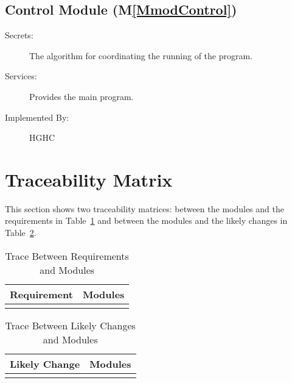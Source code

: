 \documentclass[12pt]{article}
\begin{document}
\subsection{Control Module (M\ref{MmodControl})}
\label{Sec:CM()}
\begin{description}
\item[Secrets:]The algorithm for coordinating the running of the program.
\item[Services:]Provides the main program.
\item[Implemented By:]HGHC
\end{description}
\section{Traceability Matrix}
\label{Sec:TM}
This section shows two traceability matrices: between the modules and the requirements in Table~\ref{Table:TBRaM} and between the modules and the likely changes in Table~\ref{Table:TBLCaM}.
\begin{longtable}{l l}
\toprule
Requirement & Modules
\\
\midrule
\bottomrule
\caption{Trace Between Requirements and Modules}
\label{Table:TBRaM}
\end{longtable}
\begin{longtable}{l l}
\toprule
Likely Change & Modules
\\
\midrule
\bottomrule
\caption{Trace Between Likely Changes and Modules}
\label{Table:TBLCaM}
\end{longtable}
\end{document}
